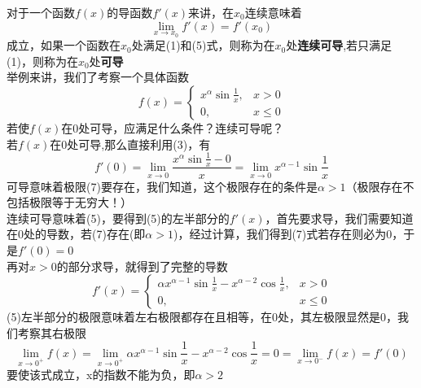 \documentclass[UTF8]{ctexart}
\begin{document}
对于一个函数$f(x)$的导函数$f'(x)$来讲，在$x_0$连续意味着
\begin{equation}
    \lim_{x \to x_0}f'(x)=f'(x_0)
\end{equation}
成立，如果一个函数在$x_0$处满足(1)和(5)式，则称为在$x_0$处\textbf{连续可导},若只满足(1)，则称为在$x_0$处\textbf{可导}\\
举例来讲，我们了考察一个具体函数
\begin{equation}
    f(x)=\begin{cases}
        x^{\alpha}\sin{\frac{1}{x}},& x>0\\
        0,& x \leqslant 0
    \end{cases}
\end{equation}
若使$f(x)$在0处可导，应满足什么条件？连续可导呢？\\
若$f(x)$在0处可导,那么直接利用(3)，有
\begin{equation}
    f'(0)=\lim_{x \to 0}\frac{x^{\alpha}\sin{\frac{1}{x}}-0}{x}=\lim_{x \to 0}x^{\alpha-1}\sin{\frac{1}{x}}
\end{equation}
可导意味着极限(7)要存在，我们知道，这个极限存在的条件是$\alpha>1$（极限存在不包括极限等于无穷大！）\\
连续可导意味着(5)，要得到(5)的左半部分的$f'(x)$，首先要求导，我们需要知道在0处的导数，若(7)存在(即$\alpha>1$)，经过计算，我们得到(7)式若存在则必为0，于是$f'(0)=0$\\
再对$x>0$的部分求导，就得到了完整的导数
\begin{equation}
    f'(x)=\begin{cases}
        \alpha x^{\alpha-1}\sin{\frac{1}{x}}-x^{\alpha-2}\cos{\frac{1}{x}},& x>0\\
        0,& x \leqslant 0
    \end{cases}
\end{equation}
(5)左半部分的极限意味着左右极限都存在且相等，在0处，其左极限显然是0，我们考察其右极限
\begin{equation}
    \lim_{x \to 0^+}f(x)=\lim_{x \to 0^+}\alpha x^{\alpha-1}\sin{\frac{1}{x}}-x^{\alpha-2}\cos{\frac{1}{x}}=0=\lim_{x \to 0^-}f(x)=f'(0)
\end{equation}
要使该式成立，x的指数不能为负，即$\alpha>2$
\end{document}
